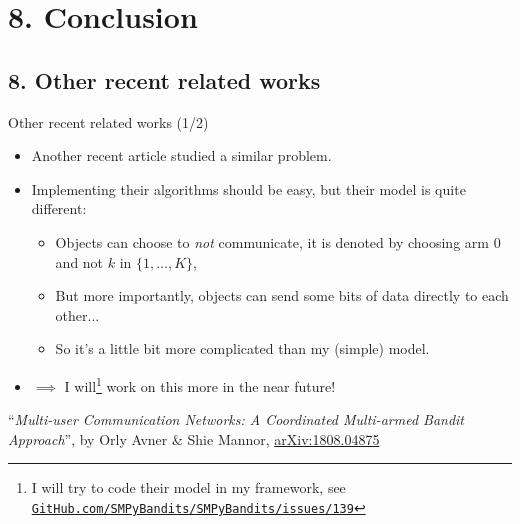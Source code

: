 \documentclass[12pt,english,ignorenonframetext,aspectratio=169,]{beamer}
\providecommand{\tightlist}{%
  \setlength{\itemsep}{0pt}\setlength{\parskip}{0pt}}
\begin{document}
\section{\hfill{}8. Conclusion\hfill{}}


\subsection{\hfill{}8. Other recent related works\hfill{}}

\begin{frame}{Other recent related works (1/2)}

\begin{itemize}\tightlist
\item
Another recent article studied a similar problem.

\pause

\item
Implementing their algorithms should be easy, but their model is quite different:

  \begin{itemize}\tightlist
  \item
  Objects can choose to \emph{not} communicate, it is denoted by choosing arm $0$ and not $k$ in $\{1,\dots,K\}$,

  \item
  \danger{} But more importantly, objects can send some bits of data directly to each other...

  \item
  So it's a little bit more complicated than my (simple) model.
  \end{itemize}

\pause
\item
$\implies$ I will\footnote{\tiny I will try to code their model in my framework, see \href{https://github.com/SMPyBandits/SMPyBandits/issues/139}{\texttt{GitHub.com/SMPyBandits/SMPyBandits/issues/139}}}
work on this more in the near future!

\end{itemize}

\vfill{}
\begin{footnotesize}
  ``\emph{Multi-user Communication Networks: A Coordinated Multi-armed Bandit Approach}'',
  by Orly Avner \& Shie Mannor,
  \textcolor{blue}{\href{https://arxiv.org/abs/1808.04875}{arXiv:1808.04875}}
\end{footnotesize}

\end{frame}
\end{document}
